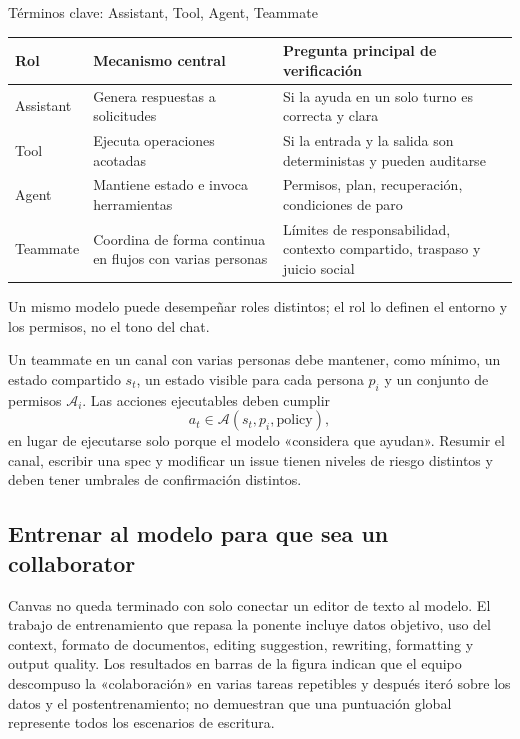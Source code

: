
\begin{knowledgebox}{Términos clave: Assistant, Tool, Agent, Teammate}
\begin{tabularx}{\textwidth}{L{0.17\textwidth} X X}
\toprule
Rol & Mecanismo central & Pregunta principal de verificación \\
\midrule
Assistant & Genera respuestas a solicitudes & Si la ayuda en un solo turno es correcta y clara \\
Tool & Ejecuta operaciones acotadas & Si la entrada y la salida son deterministas y pueden auditarse \\
Agent & Mantiene estado e invoca herramientas & Permisos, plan, recuperación, condiciones de paro \\
Teammate & Coordina de forma continua en flujos con varias personas & Límites de responsabilidad, contexto compartido, traspaso y juicio social \\
\bottomrule
\end{tabularx}
Un mismo modelo puede desempeñar roles distintos; el rol lo definen el entorno y los permisos, no el tono del chat.
\end{knowledgebox}

Un teammate en un canal con varias personas debe mantener, como mínimo, un estado compartido $s_t$, un estado visible para cada persona $p_i$ y un conjunto de permisos $\mathcal{A}_i$. Las acciones ejecutables deben cumplir
\[
a_t\in \mathcal{A}(s_t,p_i,\text{policy}),
\]
en lugar de ejecutarse solo porque el modelo «considera que ayudan». Resumir el canal, escribir una spec y modificar un issue tienen niveles de riesgo distintos y deben tener umbrales de confirmación distintos.

\subsection{Entrenar al modelo para que sea un collaborator}

Canvas no queda terminado con solo conectar un editor de texto al modelo. El trabajo de entrenamiento que repasa la ponente incluye datos objetivo, uso del context, formato de documentos, editing suggestion, rewriting, formatting y output quality. Los resultados en barras de la figura indican que el equipo descompuso la «colaboración» en varias tareas repetibles y después iteró sobre los datos y el postentrenamiento; no demuestran que una puntuación global represente todos los escenarios de escritura.

